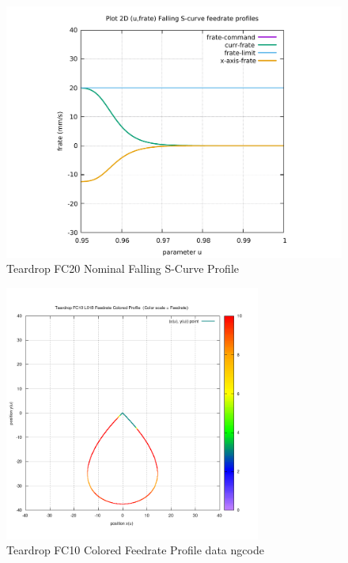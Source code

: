 \begin{figure}
	\caption     {Teardrop FC20 Nominal Falling S-Curve Profile}
	\label{16-img-Teardrop-FC20-Nominal-Falling-S-Curve-Profile.pdf}
	\includegraphics[width=1.00\textwidth]{Chap4/appendix/app-Teardrop/plots/16-img-Teardrop-FC20-Nominal-Falling-S-Curve-Profile.pdf}
\end{figure}

\clearpage
\pagebreak

\begin{figure}
	\caption     {Teardrop FC10 Colored Feedrate Profile data ngcode}
	\label{17-img-Teardrop-FC10-Colored-Feedrate-Profile-data_ngcode.png}
	\includegraphics[width=0.75\textwidth]{Chap4/appendix/app-Teardrop/plots/17-img-Teardrop-FC10-Colored-Feedrate-Profile-data_ngcode.png}
\end{figure}


